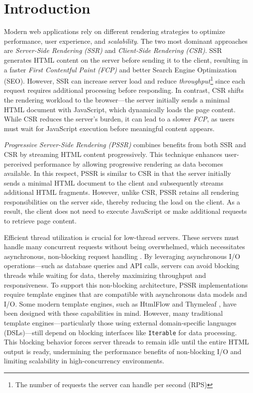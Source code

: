 \section{Introduction}


Modern web applications rely on different rendering strategies to optimize
performance, user experience, and \textit{scalability}. The two most dominant
approaches are \textit{Server-Side Rendering (SSR)} and \textit{Client-Side
    Rendering (CSR)}. SSR generates HTML content on the server before sending it to
the client, resulting in a faster \textit{First Contentful Paint (FCP)}
\cite{Edgar2024-FCP} and better Search Engine Optimization (SEO). However, SSR
can increase server load and reduce \textit{throughput}\footnote{The number of
    requests the server can handle per second (RPS)} since each request requires
additional processing before responding. In contrast, CSR shifts the rendering
workload to the browser—the server initially sends a minimal HTML document with
JavaScript, which dynamically loads the page content. While CSR reduces the
server’s burden, it can lead to a slower \textit{FCP}, as users must wait for
JavaScript execution before meaningful content appears.

\textit{Progressive Server-Side Rendering (PSSR)} combines benefits from both SSR and CSR
by streaming HTML content progressively. This technique enhances user-perceived performance by
allowing progressive rendering as data becomes available. In this respect,
PSSR is similar to CSR in that the server initially sends a minimal HTML
document to the client and subsequently streams additional HTML fragments.
However, unlike CSR, PSSR retains all rendering responsibilities on the server side,
thereby reducing the load on the client. As a result, the client does
not need to execute JavaScript or make additional requests to retrieve page content.

Efficient thread utilization is crucial for low-thread servers. These servers
must handle many concurrent requests without being overwhelmed, which
necessitates asynchronous, non-blocking request handling
\cite{carvalho2023async}. By leveraging asynchronous I/O operations—such as
database queries and API calls, servers can avoid blocking threads while
waiting for data, thereby maximizing throughput and responsiveness. To support
this non-blocking architecture, PSSR implementations require template engines
that are compatible with asynchronous data models and I/O. Some modern template
engines, such as HtmlFlow \cite{htmlflow} and Thymeleaf \cite{thymeleaf}, have
been designed with these capabilities in mind. However, many traditional
template engines—particularly those using external domain-specific languages
\cite{Fowler03} (DSLs)—still depend on blocking interfaces like
\texttt{Iterable} for data processing. This blocking behavior forces server
threads to remain idle until the entire HTML output is ready, undermining the
performance benefits of non-blocking I/O and limiting scalability in
high-concurrency environments. 

